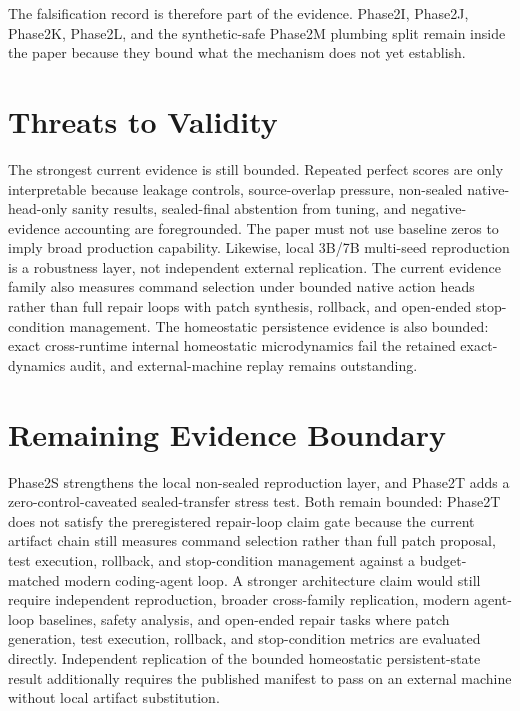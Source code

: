 \documentclass[11pt]{article}
\begin{document}
The falsification record is therefore part of the evidence. Phase2I, Phase2J,
Phase2K, Phase2L, and the synthetic-safe Phase2M plumbing split remain inside
the paper because they bound what the mechanism does not yet establish.

\section{Threats to Validity}

The strongest current evidence is still bounded. Repeated perfect scores are
only interpretable because leakage controls, source-overlap pressure, non-sealed
native-head-only sanity results, sealed-final abstention from tuning, and
negative-evidence accounting are foregrounded. The paper must not use baseline
zeros to imply broad production capability. Likewise, local 3B/7B multi-seed
reproduction is a robustness layer, not independent external replication. The
current evidence family also measures command selection under bounded native
action heads rather than full repair loops with patch synthesis, rollback, and
open-ended stop-condition management. The homeostatic persistence evidence is
also bounded: exact cross-runtime internal homeostatic microdynamics fail the
retained exact-dynamics audit, and external-machine replay remains outstanding.

\section{Remaining Evidence Boundary}

Phase2S strengthens the local non-sealed reproduction layer, and Phase2T adds a
zero-control-caveated sealed-transfer stress test. Both remain bounded:
Phase2T does not satisfy the preregistered repair-loop claim gate because the
current artifact chain still measures command selection rather than full patch
proposal, test execution, rollback, and stop-condition management against a
budget-matched modern coding-agent loop. A stronger architecture claim would
still require independent reproduction, broader cross-family replication,
modern agent-loop baselines, safety analysis, and open-ended repair tasks where
patch generation, test execution, rollback, and stop-condition metrics are
evaluated directly. Independent replication of the bounded homeostatic
persistent-state result additionally requires the published manifest to pass on
an external machine without local artifact substitution.

\nocite{project_archive}


\end{document}
